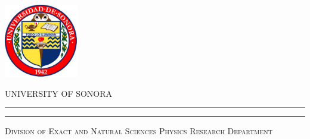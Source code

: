 \thispagestyle{empty} %
%
%
%
%
%
%
%
%
%
%
%
%
%
%
%
%
\begin{minipage}[c][0.15\textheight][c]{0.25\textwidth}
    \begin{center}
        \includegraphics[height=3.2cm, keepaspectratio=true]{unison-logo.png} %
    \end{center}
\end{minipage}
%
%
%
%
%
%
%
%
%
%
%
%
%
%
%
\begin{minipage}[c][0.17\textheight][t]{0.7\textwidth}
    \begin{center}
        {\scshape\LARGE UNIVERSITY OF SONORA} %
        \vspace{.5cm}   %
        \hrule height2.5pt  %
        \vspace{.1cm}    %
        \hrule height1pt  %
        \vspace{.4cm}   %
        {\scshape \large Division of Exact and Natural Sciences}
        {\scshape Physics Research Department} %
    \end{center}
\end{minipage}
%
%
%
%
%
%
%
%
%
%
%
%
%
%
%
%
%
%
%
%

